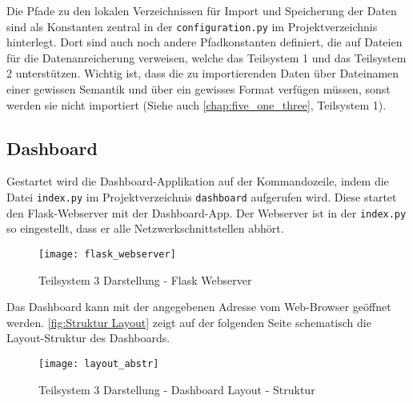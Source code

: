     Die Pfade zu den lokalen Verzeichnissen für Import und Speicherung der Daten sind als Konstanten zentral in der \texttt{configuration.py}
    im Projektverzeichnis hinterlegt. Dort sind auch noch andere Pfadkonstanten definiert, die auf Dateien für die Datenanreicherung verweisen, welche das Teilsystem 1
    und das Teilsystem 2 unterstützen. Wichtig ist, dass die zu importierenden Daten über Dateinamen einer gewissen Semantik und 
    über ein gewisses Format verfügen müssen, sonst werden sie nicht importiert (Siehe auch \autoref{chap:five_one_three}, Teilsystem 1).

    \subsection{Dashboard}
    Gestartet wird die Dashboard-Applikation auf der Kommandozeile, indem die Datei \texttt{index.py} im Projektverzeichnis \texttt{dashboard}
    aufgerufen wird. Diese startet den Flask-Webserver mit der Dashboard-App. Der Webserver ist in der \texttt{index.py} so eingestellt, 
    dass er alle Netzwerkschnittstellen abhört.


    \begin{figure}[H]
        \centering
            \texttt{[image: flask\_webserver]}
            \caption{Teilsystem 3 Darstellung - Flask Webserver}
            \label{fig:flask}
    \end{figure}

    
    Das Dashboard kann mit der angegebenen Adresse vom Web-Browser geöffnet werden.
    \autoref{fig:Struktur Layout} zeigt auf der folgenden Seite schematisch die Layout-Struktur des Dashboards. 


    \begin{figure}[H]
        \centering
            \texttt{[image: layout\_abstr]}
            \caption{Teilsystem 3 Darstellung - Dashboard Layout - Struktur}
            \label{fig:Struktur Layout}
    \end{figure}


